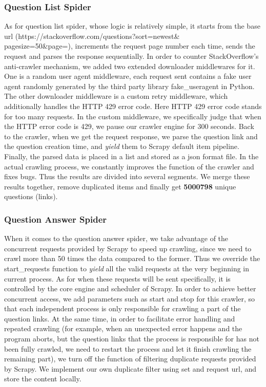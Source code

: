\documentclass[10pt,journal,compsoc]{IEEEtran}
\begin{document}
\subsubsection{Question List Spider}
\label{subsubsec: question_list_spider}

As for question list spider, whose logic is relatively simple, it starts from the base url (https://stackoverflow.com/questions?sort=newest\&\\pagesize=50\&page=), increments the request page number each time, sends the request and parses the response sequentially. In order to counter StackOverflow's anti-crawler mechanism, we added two extended downloader middlewares for it. One is a random user agent middleware, each request sent contains a fake user agent randomly generated by the third party library fake\_useragent in Python. The other downloader middleware is a custom retry middleware, which additionally handles the HTTP 429 error code. Here HTTP 429 error code stands for too many requests. In the custom middleware, we specifically judge that when the HTTP error code is 429, we pause our crawler engine for 300 seconds. Back to the crawler, when we get the request response, we parse the question link and the question creation time, and \emph{yield} them to Scrapy default item pipeline. Finally, the parsed data is placed in a list and stored as a json format file. In the actual crawling process, we constantly improves the function of the crawler and fixes bugs. Thus the results are divided into several segments. We merge these results together, remove duplicated items and finally get \textbf{5000798} unique questions (links).

\subsubsection{Question Answer Spider}
\label{subsubsec: question answer spider}

When it comes to the question answer spider, we take advantage of the concurrent requests provided by Scrapy to speed up crawling, since we need to crawl more than 50 times the data compared to the former. Thus we override the start\_requests function to \emph{yield} all the valid requests at the very beginning in current process. As for when these requests will be sent specifically, it is controlled by the core engine and scheduler of Scrapy. In order to achieve better concurrent access, we add parameters such as start and stop for this crawler, so that each independent process is only responsible for crawling a part of the question links. At the same time, in order to facilitate error handling and repeated crawling (for example, when an unexpected error happens and the program aborts, but the question links that the process is responsible for has not been fully crawled, we need to restart the process and let it finish crawling the remaining part), we turn off the function of filtering duplicate requests provided by Scrapy. We implement our own duplicate filter using set and request url, and store the content locally. 
\end{document}
